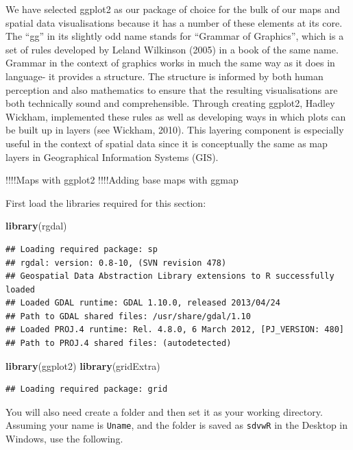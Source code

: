 \documentclass[]{article}
\newenvironment{Shaded}{}{}
\newcommand{\KeywordTok}[1]{\textcolor[rgb]{0.00,0.44,0.13}{\textbf{{#1}}}}
\newcommand{\NormalTok}[1]{{#1}}
\begin{document}
We have selected ggplot2 as our package of choice for the bulk of our
maps and spatial data visualisations because it has a number of these
elements at its core. The ``gg'' in its slightly odd name stands for
``Grammar of Graphics'', which is a set of rules developed by Leland
Wilkinson (2005) in a book of the same name. Grammar in the context of
graphics works in much the same way as it does in language- it provides
a structure. The structure is informed by both human perception and also
mathematics to ensure that the resulting visualisations are both
technically sound and comprehensible. Through creating ggplot2, Hadley
Wickham, implemented these rules as well as developing ways in which
plots can be built up in layers (see Wickham, 2010). This layering
component is especially useful in the context of spatial data since it
is conceptually the same as map layers in Geographical Information
Systems (GIS).

!!!!Maps with ggplot2 !!!!Adding base maps with ggmap

First load the libraries required for this section:

\begin{Shaded}
\begin{Highlighting}[]
\KeywordTok{library}\NormalTok{(rgdal)}
\end{Highlighting}
\end{Shaded}
\begin{verbatim}
## Loading required package: sp
## rgdal: version: 0.8-10, (SVN revision 478)
## Geospatial Data Abstraction Library extensions to R successfully loaded
## Loaded GDAL runtime: GDAL 1.10.0, released 2013/04/24
## Path to GDAL shared files: /usr/share/gdal/1.10
## Loaded PROJ.4 runtime: Rel. 4.8.0, 6 March 2012, [PJ_VERSION: 480]
## Path to PROJ.4 shared files: (autodetected)
\end{verbatim}
\begin{Shaded}
\begin{Highlighting}[]
\KeywordTok{library}\NormalTok{(ggplot2)}
\KeywordTok{library}\NormalTok{(gridExtra)}
\end{Highlighting}
\end{Shaded}
\begin{verbatim}
## Loading required package: grid
\end{verbatim}
You will also need create a folder and then set it as your working
directory. Assuming your name is \texttt{Uname}, and the folder is saved
as \texttt{sdvwR} in the Desktop in Windows, use the following.
\end{document}
